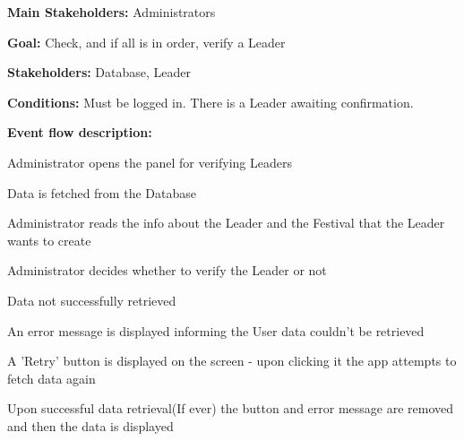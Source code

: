 				\noindent {}
				\begin{packed_item}
					\item \textbf{Main Stakeholders:} Administrators
					\item \textbf{Goal:} Check, and if all is in order, verify a Leader
					\item \textbf{Stakeholders:} Database, Leader
					\item \textbf{Conditions:} Must be logged in. There is a Leader awaiting confirmation.
					\item \textbf{Event flow description: }
					\begin{packed_enum}
						\item Administrator opens the panel for verifying Leaders
						\item Data is fetched from the Database
						\item Administrator reads the info about the Leader and the Festival that the Leader wants to create
						\item Administrator decides whether to verify the Leader or not
					\end{packed_enum}
					
					\begin{packed_item}
						\item[2.a] Data not successfully retrieved
						\item[] \begin{packed_enum}
							\item An error message is displayed informing the User data couldn't be retrieved
							\item A 'Retry' button is displayed on the screen - upon clicking it the app attempts to fetch data again
							\item Upon successful data retrieval(If ever) the button and error message are removed and then the data is displayed
						\end{packed_enum}
					\end{packed_item}
				\end{packed_item}
			
